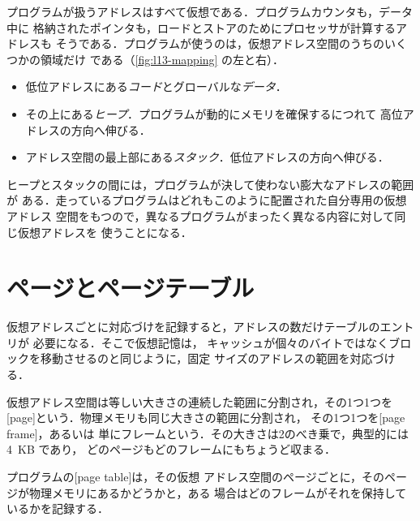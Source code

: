 \documentclass[../main.tex]{subfiles}
\begin{document}
プログラムが扱うアドレスはすべて仮想である．プログラムカウンタも，データ中に
格納されたポインタも，ロードとストアのためにプロセッサが計算するアドレスも
そうである．プログラムが使うのは，仮想アドレス空間のうちのいくつかの領域だけ
である（\cref{fig:l13-mapping} の左と右）．
\begin{itemize}
  \item 低位アドレスにある\emph{コード}とグローバルな\emph{データ}．
  \item その上にある\emph{ヒープ}．プログラムが動的にメモリを確保するにつれて
    高位アドレスの方向へ伸びる．
  \item アドレス空間の最上部にある\emph{スタック}．低位アドレスの方向へ伸びる．
\end{itemize}
ヒープとスタックの間には，プログラムが決して使わない膨大なアドレスの範囲が
ある．走っているプログラムはどれもこのように配置された自分専用の仮想アドレス
空間をもつので，異なるプログラムがまったく異なる内容に対して同じ仮想アドレスを
使うことになる．

\section{ページとページテーブル}
\label{sec:l13-pages}

仮想アドレスごとに対応づけを記録すると，アドレスの数だけテーブルのエントリが
必要になる．そこで仮想記憶は，
キャッシュが個々のバイトではなくブロックを移動させるのと同じように，固定
サイズのアドレスの範囲を対応づける．

\begin{definition}[ページとページフレーム]
  仮想アドレス空間は等しい大きさの連続した範囲に分割され，その1つ1つを
  [page]という．物理メモリも同じ大きさの範囲に分割され，
  その1つ1つを[page frame]，あるいは
  単にフレームという．その大きさは2のべき乗で，典型的には 4~KB であり，
  どのページもどのフレームにもちょうど収まる．
\end{definition}

\begin{definition}[ページテーブル]
  プログラムの[page table]は，その仮想
  アドレス空間のページごとに，そのページが物理メモリにあるかどうかと，ある
  場合はどのフレームがそれを保持しているかを記録する．
\end{definition}
\end{document}
